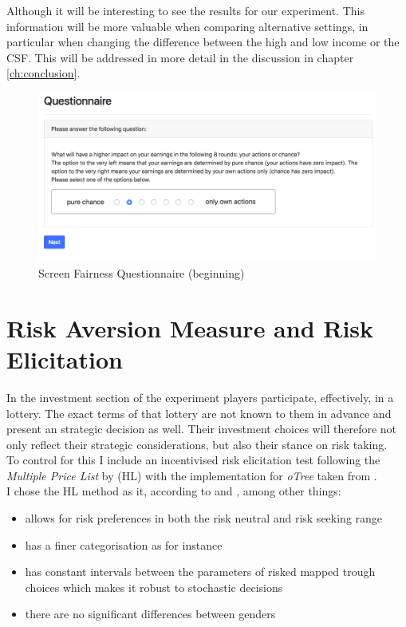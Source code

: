     Although it will be interesting to see the results for our experiment. This information will be more valuable when comparing alternative settings, in particular when changing the difference between the high and low income or the CSF. This will be addressed in more detail in the discussion in chapter \ref{ch:conclusion}.
    
    
    \begin{figure}
        \centering
        \includegraphics[width=\textwidth]{graphs/Fairness_Q_Begin.png}
        \caption{Screen Fairness Questionnaire (beginning)}
        \label{fig:fair_q}
    \end{figure}
    
        
    \section{Risk Aversion Measure and Risk Elicitation}
    
    In the investment section of the experiment players participate, effectively, in a lottery. The exact terms of that lottery are not known to them in advance and present an strategic decision as well. Their investment choices will therefore not only reflect their strategic considerations, but also their stance on risk taking.\\
    
    To control for this I include an incentivised risk elicitation test following the \textit{Multiple Price List} by \cite{holt2002} (HL) with the implementation for \textit{oTree} taken from \cite{holzmeister2017}.\\
    
    I chose the HL method as it, according to \cite{crosetto2016} and \cite{harrison2008}, among other things:
    \begin{itemize}
        \item allows for risk preferences in both the risk neutral and risk seeking range
        \item has a finer categorisation as for instance \cite{eckel2008}
        \item has constant intervals between the parameters of risked mapped trough choices which makes it robust to stochastic decisions
        \item there are no significant differences between genders
    \end{itemize}  
       
